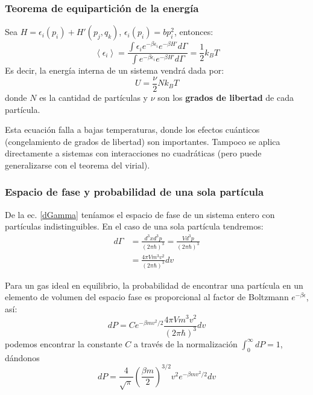 \documentclass[]{article}
\numberwithin{equation}{section}
\newcommand{\0}{\textcolor{gray}{0}}
\begin{document}
\subsubsection{Teorema de equipartición de la energía}
Sea \(H = \epsilon_i(p_i) + H'(p_j, q_k)\), \(\epsilon_i(p_i) = b p_i^2\), entonces:
\begin{equation}
	\left\langle \epsilon_i\right\rangle = \frac{\int\epsilon_i e^{-\beta \epsilon_i} e^{-\beta H'} d\Gamma}{\int e^{-\beta \epsilon_i} e^{-\beta H'} d\Gamma} = \frac{1}{2}k_B T
\end{equation}
Es decir, la energía interna de un sistema vendrá dada por:
\begin{equation}
	U = \frac{\nu}{2}N k_B T
\end{equation}
donde \(N\) es la cantidad de partículas y \(\nu\) son los \textbf{grados de libertad} de cada partícula.

Esta ecuación falla a bajas temperaturas, donde los efectos cuánticos (congelamiento de grados de libertad) son importantes. Tampoco se aplica directamente a sistemas con interacciones no cuadráticas (pero puede generalizarse con el teorema del virial).

\subsubsection{Espacio de fase y probabilidad de una sola partícula}
De la ec. \ref{dGamma} teníamos el espacio de fase de un sistema entero con partículas indistinguibles. En el caso de una sola partícula tendremos:
\begin{align}
	d\Gamma &= \frac{d^3xd^3p}{(2\pi\hbar)^3} = \frac{Vd^3p}{(2\pi\hbar)^3}\nonumber\\
	&= \frac{4\pi V m^3 v^2}{(2\pi\hbar)^3}dv
\end{align}

Para un gas ideal en equilibrio, la probabilidad de encontrar una partícula en un elemento de volumen del espacio fase es proporcional al factor de Boltzmann \(e^{-\beta\epsilon}\), así:
\begin{equation*}
	dP = C e^{-\beta m v^2/2} \frac{4\pi V m^3 v^2}{(2\pi\hbar)^3}dv
\end{equation*}
podemos encontrar la constante \(C\) a través de la normalización \(\int_{0}^{\infty}dP = 1\), dándonos
\begin{equation}
	dP = \frac{4}{\sqrt{\pi}}\left(\frac{\beta m}{2}\right)^{3/2} v^2 e^{-\beta m v^2/2} dv
\end{equation}
\end{document}
